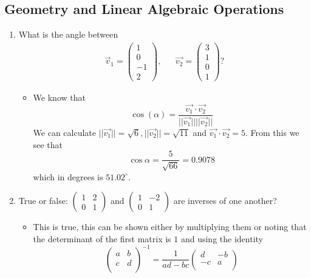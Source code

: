 \documentclass{article}
\begin{document}
\subsection{Geometry and Linear Algebraic Operations}
\begin{enumerate}
\item What is the angle between
$$
\begin{aligned}
\vec v_1 = \begin{pmatrix} 1 \\ 0 \\ -1 \\ 2 \end{pmatrix},&& \vec{v_2} = \begin{pmatrix} 3 \\ 1 \\ 0 \\ 1 \end{pmatrix}?
\end{aligned}
$$
	\begin{itemize}
		\item We know that
		$$
			\cos(\alpha) = \frac{\vec{v_1} \cdot \vec{v_2}}{||\vec{v_1}|| ||\vec{v_2}||}
		$$
		We can calculate $||\vec{v_1}|| = \sqrt{6}, ||\vec{v_2}|| =  \sqrt{11}$ and $\vec{v_1} \cdot \vec{v_2} = 5$. From this we see that
		$$
		\cos{\alpha} = \frac{5}{\sqrt{66}} = 0.9078
		$$
		which in degrees is $51.02^\circ$.
	\end{itemize}
\item True or false: $\begin{pmatrix}1 & 2 \\ 0 & 1\end{pmatrix}$ and $\begin{pmatrix}1 & -2 \\ 0 & 1 \end{pmatrix}$ are inverses of one another?
	\begin{itemize}
		\item This is true, this can be shown either by multiplying them or noting that the determinant of the first matrix is $1$ and using the identity
		$$
		\begin{pmatrix}
		a & b \\
		c & d \\
		\end{pmatrix}^{-1} =
		\frac{1}{ad - bc}
		\begin{pmatrix}
		d & -b \\
		-c & a \\
		\end{pmatrix}
$$
\end{itemize}
\end{enumerate}
\end{document}
